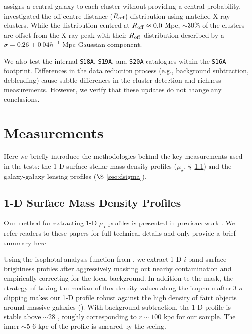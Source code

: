 \documentclass[fleqn,usenatbib,useAMS]{mnras}
\begin{document}
    \camira{} assigns a central galaxy to each cluster without providing a central probability.
    \citet{Oguri2018} investigated the off-centre distance ($R_{\rm off}$) distribution using
    matched X-ray clusters.
    While the distribution centred at $R_{\rm off} \approx 0.0$ Mpc, $\sim 30$\% of the 
    clusters are offset from the X-ray peak with their $R_{\rm off}$ distribution described by a
    $\sigma=0.26 \pm 0.04 h^{-1}$ Mpc Gaussian component.

    We also test the internal \texttt{S18A}, \texttt{S19A}, and \texttt{S20A} \camira{} catalogues
    within the \texttt{S16A} footprint.
    Differences in the data reduction process (e.g., background subtraction, deblending)
    cause subtle differences in the cluster detection and richness measurements.
    However, we verify that these updates do not change any conclusions.

\section{Measurements}
    \label{sec:measure}

    Here we briefly introduce the methodologies behind the key measurements used in the \topn{}
    tests: the 1-D surface stellar mass density profiles ($\mu_{\star}$, \S\ \ref{sec:1d_prof})
    and the galaxy-galaxy lensing \dsigma{} profiles ($\S$ \ref{sec:dsigma}).

\subsection{1-D Surface Mass Density Profiles}
    \label{sec:1d_prof}

    Our method for extracting 1-D $\mu_{\star}$ profiles is presented in previous work
    \citep{Huang2018b, Huang2018c, Ardila2021}.
    We refer readers to these papers for full technical details and only provide a brief summary
    here.

    Using the \ellipse{} isophotal analysis function from \iraf{}, we extract 1-D $i$-band
    surface brightness profiles after aggressively masking out nearby contamination and
    empirically correcting for the local background.
    In addition to the mask, the strategy of taking the median of flux density values along the
    isophote after 3-$\sigma$ clipping makes our 1-D profile robust against the high density of
    faint objects around massive galaxies (\citealt{Ardila2021}).
    With background subtraction, the 1-D profile is stable above $\sim 28$ \smag{}, roughly
    corresponding to $r\sim 100$ kpc for our sample.
    The inner $\sim 5$-6 kpc of the profile is smeared by the seeing.
\end{document}
